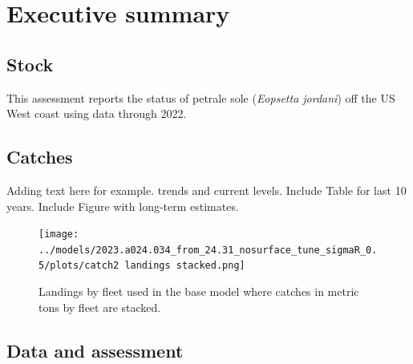 \documentclass[11pt,
  english,
  letterpaper,
]{article}
\begin{document}
\newcommand{\lt}{\ensuremath <}
\newcommand{\gt}{\ensuremath >}

\pagebreak
{}
\setcounter{page}{1}

\renewcommand{\thetable}{\roman{table}}
\renewcommand{\thefigure}{\roman{figure}}

\setlength\parskip{0.5em plus 0.1em minus 0.2em}

\hypertarget{executive-summary}{%
\section*{Executive summary}\label{executive-summary}}

\hypertarget{stock}{%
\subsection*{Stock}\label{stock}}

This assessment reports the status of petrale sole (\emph{Eopsetta jordani}) off the US West coast using data through 2022.

\hypertarget{catches}{%
\subsection*{Catches}\label{catches}}

Adding text here for example. trends and current levels. Include Table for last 10 years. Include Figure with long-term estimates.

\clearpage



\begin{figure}
\centering
\texttt{[image: ../models/2023.a024.034\_from\_24.31\_nosurface\_tune\_sigmaR\_0.5/plots/catch2 landings stacked.png]}
\caption{Landings by fleet used in the base model where catches in metric tons by fleet are stacked.\label{fig:es-catch}}
\end{figure}

\clearpage

\hypertarget{data-and-assessment}{%
\subsection*{Data and assessment}\label{data-and-assessment}}
\end{document}
